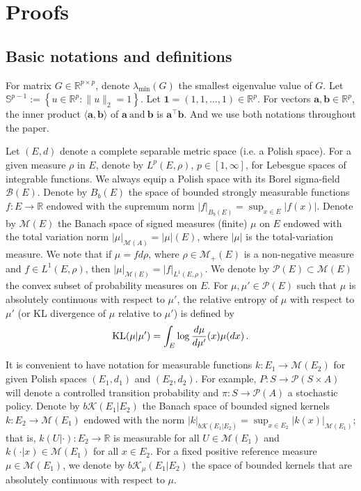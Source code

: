 \documentclass{amsart}
\theoremstyle{definition}
\begin{document}
\allowdisplaybreaks
\section{Proofs}
\subsection{Basic notations and definitions}
\label{sec:nota and def}

 
For matrix $G \in \mathbb{R}^{p \times p}$, denote $\lambda_{\min} (G)$ the smallest eigenvalue value of $G$. 
Let $\mathbb S^{p-1}
:=
\left\{u\in\mathbb R^p:\|u\|_2=1\right\}.$ 
Let $ \mathbf{1} = (1,1, \dots,1) \in \mathbb{R}^p$. For vectors $\mathbf{a}, \mathbf{b} \in \mathbb{R}^p$, the inner product $\langle \mathbf{a}, \mathbf{b}\rangle$ of $\mathbf{a}\ \text{and} \ \mathbf{b}$ is $\mathbf{a}^\top\mathbf{b}$.
And we use both notations throughout the paper.

Let $(E,d)$ denote a complete separable metric space (i.e. a Polish space). 
For a given measure $\rho$ in $E$, denote by $L^p(E,\rho)$, $p\in [1,\infty]$, for Lebesgue spaces of integrable functions. 
We always equip a Polish space with its Borel sigma-field $\mathcal{B}(E).$ 
Denote by $B_b(E)$ the space of bounded strongly measurable functions $f:E\rightarrow \mathbb{R}$ endowed with the supremum norm $|f|_{B_b(E)}=\sup_{x\in E}|f(x)|$. 
Denote by $\mathcal{M}(E)$ the Banach space of signed measures (finite) $\mu$ on $E$ endowed with the total variation norm $|\mu|_{\mathcal{M}(A)}=|\mu|(E)$, where $|\mu|$ is the total-variation measure. 
We note that if $\mu=f d\rho$, where $\rho \in \mathcal{M}_+(E)$ is a non-negative measure and $f\in L^1(E,\rho)$, then  $|\mu|_{\mathcal{M}(E)}=|f|_{L^1(E,\rho)}$. 
We denote by $\mathcal{P}(E)\subset\mathcal{M}(E)$ the convex subset of probability measures on $E$. 
For $\mu,\mu'\in \mathcal{P}(E)$ such that $\mu$ is absolutely continuous with respect to $\mu'$, the relative entropy of $\mu$ with respect to $\mu'$ (or KL divergence of $\mu$ relative to $\mu'$) is defined by 
\[
\textnormal{KL}(\mu|\mu')=\int_{E}\log\frac{d\mu}{d\mu'}(x)\mu(dx)\,.
\]

It is convenient to have notation for measurable functions $k:E_1\rightarrow \mathcal{M}(E_2)$ for given Polish spaces $(E_1,d_1)$ and $(E_2,d_2)$. 
For example, $P:S\rightarrow \mathcal{P}(S\times A)$ will denote a controlled transition probability and $\pi: S\rightarrow \mathcal{P}(A)$ a stochastic policy. 
Denote by $b\mathcal{K}(E_1|E_2)$ the Banach space of bounded signed kernels $k: E_2 \rightarrow \mathcal{M}(E_1)$ endowed with the norm $|k|_{b\mathcal{K}(E_1|E_2)}=\sup_{x\in E_2}|k(x)|_{\mathcal{M}(E_1)}$; that is, $k(U|\cdot): E_2\rightarrow \mathbb{R}$ is measurable for all $U\in \mathcal{M}(E_1)$ and $k(\cdot|x)\in \mathcal{M}(E_1)$ for all $x\in E_2$. 
For a fixed positive reference measure $\mu \in \mathcal{M}(E_1)$, we denote by $b\mathcal{K}_{\mu}(E_1|E_2)$ the space of bounded kernels that are absolutely continuous with respect to $\mu$. 
\end{document}
